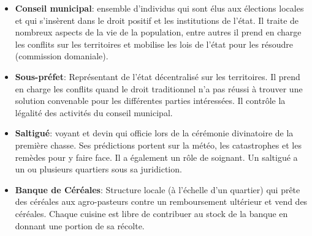 \begin{paracol}{2}
\begin{itemize}
    \item \textbf{Conseil municipal}: ensemble d'individus qui sont élus aux élections locales et qui s'insèrent dans le droit positif et les institutions de l'état. Il traite de nombreux aspects de la vie de la population, entre autres il prend en charge les conflits sur les territoires et mobilise les lois de l'état pour les résoudre  (commission domaniale).
    \item \textbf{Sous-préfet}: Représentant de l'état décentralisé sur les territoires. Il prend en charge les conflits quand le droit traditionnel n'a pas réussi à trouver une solution convenable pour les différentes parties intéressées. Il contrôle la légalité des activités du conseil municipal.
    \item \textbf{Saltigué}: voyant et devin qui officie lors de la cérémonie divinatoire de la première chasse. Ses prédictions portent sur la météo, les catastrophes et les remèdes pour y faire face. Il a également un rôle de soignant. Un saltigué a un ou plusieurs quartiers sous sa juridiction.
    \item \textbf{Banque de Céréales}: Structure locale (à l'échelle d'un quartier) qui prête des céréales aux agro-pasteurs contre un remboursement ultérieur et vend des céréales. Chaque cuisine est libre de contribuer au stock de la banque en donnant une portion de sa récolte.
  \end{itemize}


\end{paracol}
